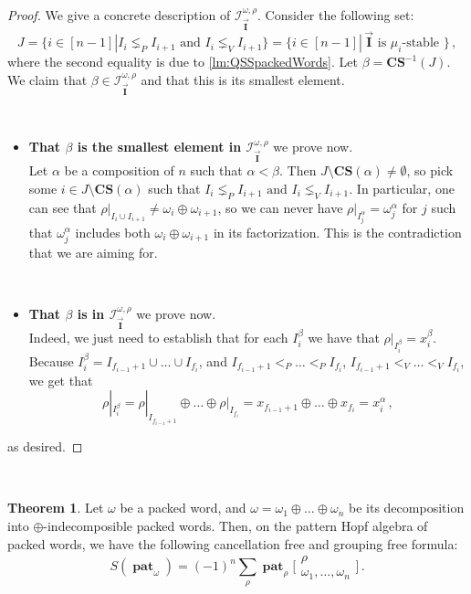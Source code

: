 \documentclass[12pt, reqno]{amsart}
\theoremstyle{definition}
\newtheorem{thm}{Theorem}[section]
\newcommand{\III}{\vec{\mathbf{I}}}
\DeclareMathOperator{\pat}{\mathbf{pat}}
\begin{document}
\begin{proof}
We give a concrete description of $\mathcal I^{\omega, \rho}_{\III}$.
Consider the following set:
$$J = \{i \in [n-1] | I_i \lneq_P I_{i+1} \text{ and } I_i \lneq_V I_{i+1} \} = \{i \in [n-1] | \, \III \text{ is $\mu_i$-stable } \} \, ,$$
where the second equality is due to \cref{lm:QSSpackedWords}.
Let $\beta = \mathbf{CS}^{-1}( J)$. 
We claim that $\beta \in \mathcal I^{\omega, \rho}_{\III}$ and that this is its smallest element.

\
\begin{itemize}
    \item {\bf That $\beta$ is the smallest element in $\mathcal I^{\omega, \rho}_{\III}$} we prove now. \\
Let $\alpha $ be a composition of $n$ such that $\alpha < \beta$. Then $J \setminus \mathbf{CS}(\alpha)\neq \emptyset $, so pick some $i \in  J \setminus \mathbf{CS}(\alpha) $ such that $ I_i \lneq_P I_{i+1} \text{ and } I_i \lneq_V I_{i+1} $.
In particular, one can see that $\rho|_{I_i \cup I_{i+1}} \neq \omega_i \oplus \omega_{i+1}$, so we can never have $\rho|_{I^{\alpha}_j} = \omega^{\alpha}_j$ for $j$ such that $\omega^{\alpha}_j$ includes both $\omega_i \oplus \omega_{i+1}$ in its factorization.
This is the contradiction that we are aiming for.

\

\item {\bf That $\beta$ is in $\mathcal I^{\omega, \rho}_{\III}$} we prove now.\\
Indeed, we just need to establish that for each $I^{\beta}_i$ we have that $\rho|_{I^{\beta}_i} = x^{\beta}_i$.
Because $I^{\beta}_i = I_{f_{i-1} + 1} \cup \dots \cup I_{f_i}$, and $I_{f_{i-1} + 1} <_P \dots <_P I_{f_i}$, $I_{f_{i-1} + 1} <_V \dots <_V I_{f_i}$, we get that 
$$\rho|_{I^{\beta}_i} = \rho|_{I_{f_{i-1} + 1}} \oplus \dots \oplus \rho|_{I_{f_i}} = x_{f_{i-1} + 1} \oplus \dots\oplus x_{f_i} = x^{\alpha}_i\,  ,$$
\end{itemize}
as desired.
\end{proof}

\

\begin{thm}\label{thm:antipode_packed}
Let $\omega $ be a packed word, and $\omega = \omega_1 \oplus \dots \oplus \omega_n$ be its decomposition into $\oplus$-indecomposible packed words.
Then, on the pattern Hopf algebra of packed words, we have the following cancellation free and grouping free formula:
$$S(\pat_{\omega}) = (-1)^n  \sum_{\rho} \pat_{\rho} \bigl[\!\begin{smallmatrix} \rho  \\ \omega_1, \dots, \omega_n \end{smallmatrix}\!\bigr] \, .$$
\end{thm}
\end{document}
